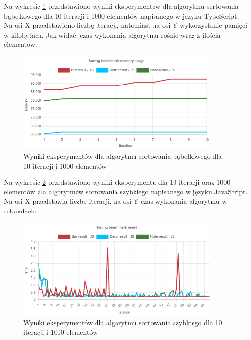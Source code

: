 Na wykresie \ref{fig:quick_sorting_e1_memory_ts} przedstawiono wyniki eksperymentów dla algorytmu sortowania bąbelkowego dla 10 iteracji i 1000 elementów napisanego w języku TypeScript. Na osi X przedstawiono liczbę iteracji, natomiast na osi Y wykorzystanie pamięci w kilobytach. Jak widać, czas wykonania algorytmu rośnie wraz z ilością elementów.
\begin{figure}[H]
  \centering
  \includegraphics[width=0.9\textwidth]{Figures/sorting/quick/e1_memory_ts.png}
  \caption{Wyniki eksperymentów dla algorytmu sortowania bąbelkowego dla 10 iteracji i 1000 elementów}
  \label{fig:quick_sorting_e1_memory_ts}
\end{figure}

Na wykresie \ref{fig:quick_sorting_e2} przedstawiono wyniki eksperymentu dla 10 iteracji oraz 1000 elementów dla algorytmów sortowania szybkiego napisanego w języku JavaScript. Na osi X przedstawia liczbę iteracji, na osi Y czas wykonania algorytmu w sekundach. 

\begin{figure}[H]
  \centering
  \includegraphics[width=0.9\textwidth]{Figures/sorting/quick/e2_js.png}
  \caption{Wyniki eksperymentów dla algorytmu sortowania szybkiego dla 10 iteracji i 1000 elementów}
  \label{fig:quick_sorting_e2}
\end{figure}


